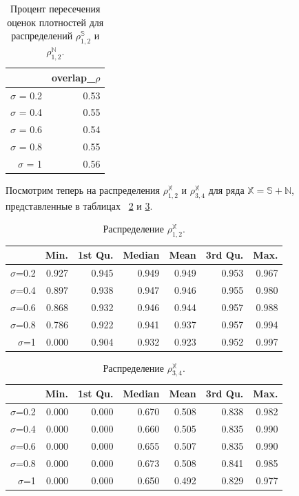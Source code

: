 \documentclass[specialist,
               substylefile = spbu.rtx,
               subf,href,colorlinks=true, 12pt]{disser}
\begin{document}
\begin{table}[hhh!]
\caption{Процент пересечения оценок плотностей для распределений $\rho^{\mathbb{S}}_{1,2}$ и $\rho^{\mathbb{N}}_{1,2}$.}
\centering
\begin{tabular}{rr}
  \hline
 & overlap\_$\rho$ \\
  \hline
$\sigma$ = 0.2 & 0.53 \\
  $\sigma$ = 0.4 & 0.55 \\
  $\sigma$ = 0.6 & 0.54 \\
  $\sigma$ = 0.8 & 0.55 \\
  $\sigma$ = 1 & 0.56 \\
   \hline
\end{tabular}
\label{tab:model_dist_pgram_overlap_222}
\end{table}

Посмотрим теперь на распределения  $\rho^{\mathbb{X}}_{1,2}$ и  $\rho^{\mathbb{X}}_{3,4}$ для ряда $\mathbb{X} = \mathbb{S} + \mathbb{N}$, представленные в таблицах ~\ref{tab:model_dist_pgram_sig_noise2} и \ref{tab:model_dist_pgram_sig_noise22}.

\begin{table}[hhh!]
\caption{Распределение $\rho^{\mathbb{X}}_{1,2}$.}
\centering
\begin{tabular}{rrrrrrr}
  \hline
 & Min. & 1st Qu. & Median & Mean & 3rd Qu. & Max. \\
  \hline
$\sigma$=0.2 & 0.927 & 0.945 & 0.949 & 0.949 & 0.953 & 0.967 \\
  $\sigma$=0.4 & 0.897 & 0.938 & 0.947 & 0.946 & 0.955 & 0.980 \\
  $\sigma$=0.6 & 0.868 & 0.932 & 0.946 & 0.944 & 0.957 & 0.988 \\
  $\sigma$=0.8 & 0.786 & 0.922 & 0.941 & 0.937 & 0.957 & 0.994 \\
  $\sigma$=1 & 0.000 & 0.904 & 0.932 & 0.923 & 0.952 & 0.997 \\
   \hline
\end{tabular}
\label{tab:model_dist_pgram_sig_noise2}
\end{table}

\begin{table}[hhh!]
\caption{Распределение $\rho^{\mathbb{X}}_{3,4}$.}
\centering
\begin{tabular}{rrrrrrr}
  \hline
 & Min. & 1st Qu. & Median & Mean & 3rd Qu. & Max. \\
  \hline
$\sigma$=0.2 & 0.000 & 0.000 & 0.670 & 0.508 & 0.838 & 0.982 \\
  $\sigma$=0.4 & 0.000 & 0.000 & 0.660 & 0.505 & 0.835 & 0.990 \\
  $\sigma$=0.6 & 0.000 & 0.000 & 0.655 & 0.507 & 0.835 & 0.990 \\
  $\sigma$=0.8 & 0.000 & 0.000 & 0.673 & 0.508 & 0.841 & 0.985 \\
  $\sigma$=1 & 0.000 & 0.000 & 0.650 & 0.492 & 0.829 & 0.977 \\
   \hline
\end{tabular}
\label{tab:model_dist_pgram_sig_noise22}
\end{table}
\end{document}
